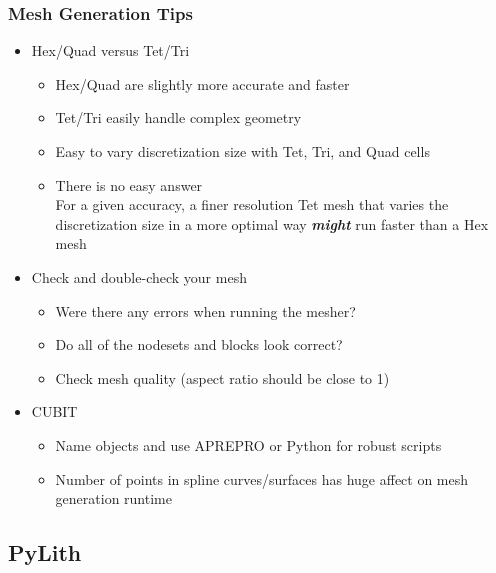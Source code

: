\documentclass{beamer}
\begin{document}
\begin{frame}
  \frametitle{Mesh Generation Tips}
 
  \begin{itemize}
  \item Hex/Quad versus Tet/Tri
    \begin{itemize}
    \item Hex/Quad are slightly more accurate and faster
    \item Tet/Tri easily handle complex geometry
    \item Easy to vary discretization size with Tet, Tri, and Quad cells
    \item There is no easy answer\\
      For a given accuracy, a finer resolution Tet mesh that varies
      the discretization size in a more optimal way {\bf\it might} run
      faster than a Hex mesh
    \end{itemize}
  \item Check and double-check your mesh
    \begin{itemize}
    \item Were there any errors when running the mesher?
    \item Do all of the nodesets and blocks look correct?
    \item Check mesh quality (aspect ratio should be close to 1)
    \end{itemize}
  \item CUBIT
    \begin{itemize}
    \item Name objects and use APREPRO or Python for robust scripts
    \item Number of points in spline curves/surfaces has huge affect
      on mesh generation runtime
    \end{itemize}
  \end{itemize}

\end{frame}


\subsection{PyLith}
\end{document}
